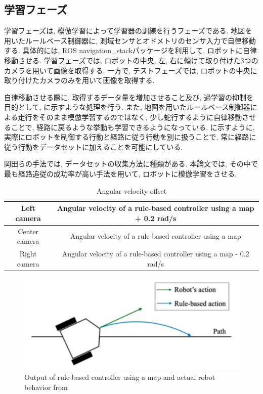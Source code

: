 \subsection{学習フェーズ}
学習フェーズは, 模倣学習によって学習器の訓練を行うフェーズである. 地図を用いたルールベース制御器に, 測域センサとオドメトリのセンサ入力で自律移動する. 具体的には, ROS navigation\_stackパッケージを利用して, ロボットに自律移動させる. 学習フェーズでは, ロボットの中央, 左, 右に傾けて取り付けた3つのカメラを用いて画像を取得する. 一方で, テストフェーズでは, ロボットの中央に取り付けたカメラのみを用いて画像を取得する. 
\par
自律移動させる際に, 取得するデータ量を増加させること及び, 過学習の抑制を目的として, に示すような処理を行う. また, 地図を用いたルールベース制御器による走行をそのまま模倣学習するのではなく, 少し蛇行するように自律移動させることで, 経路に戻るような挙動も学習できるようになっている. に示すように, 実際にロボットを制御する行動と経路に従う行動を別に扱うことで, 常に経路に従う行動をデータセットに加えることを可能にしている. 
\par
岡田らの手法では, データセットの収集方法に種類がある. 
本論文では, その中で最も経路追従の成功率が高い手法を用いて, ロボットに模倣学習をさせる.

\begin{table}[hbtp]
  \caption{Angular velocity offset}
  \label{table:angular}
  \centering
  \begin{tabular}{|c|c|}
    \hline
    Left camera  & Angular velocity of a rule-based controller using a map + 0.2 rad/s\\
    \hline
    Center camera  & Angular velocity of a rule-based controller using a map  \\
    \hline
    Right camera  & Angular velocity of a rule-based controller using a map - 0.2 rad/s   \\
    \hline
  \end{tabular}
\end{table}

\begin{figure}[hbtp]
  \centering
 \includegraphics[keepaspectratio, scale=0.38]
      {images/dakou.png}
 \caption{Output of rule-based controller using a map and actual robot behavior from \cite{okada1}}
 \label{Fig:dakou}
\end{figure}

